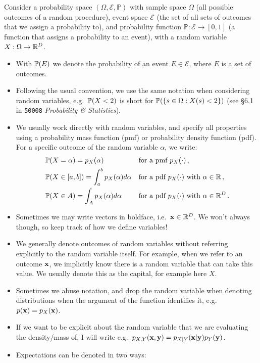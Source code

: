 \documentclass[a4paper]{article}
\theoremstyle{definition}
\newcommand{\courseprobstats}{\texttt{50008} \textit{Probability \& Statistics}}
\begin{document}
Consider a probability space $(\Omega, \mathcal E, \mathbb P)$ with sample space $\Omega$ (all possible outcomes of a random procedure), event space $\mathcal E$ (the set of all sets of outcomes that we assign a probability to), and probability function $\mathbb P : \mathcal E \to [0, 1]$ (a function that assigns a probability to an event), with a random variable $X: \Omega \to \mathbb{R}^D$.
\begin{itemize}
\item With $\prob{E}$ we denote the probability of an event $E \in \mathcal E$, where $E$ is a set of outcomes.
\item Following the usual convention, we use the same notation when considering random variables, e.g.~$\prob{X < 2}$ is short for $\prob{\{s \in \Omega : X(s) < 2\}}$ (see \S6.1 in \courseprobstats).
\item We usually work directly with random variables, and specify all properties using a probability mass function (pmf) or probability density function (pdf). For a specific outcome of the random variable $\alpha$, we write:
\begin{align}
    &\prob{X=\alpha} = p_X(\alpha) && \text{for a pmf } p_X(\cdot) \,, \\
    &\prob{X \in [a, b]} = \int_a^b p_X(\alpha) d\alpha && \text{for a pdf $p_X(\cdot)$ with $\alpha \in \Reals$} \,, \\
    &\prob{X \in A} = \int_A p_X(\alpha) d\alpha && \text{for a pdf $p_X(\cdot)$ with $\alpha \in \Reals^D$}
    \,.
\end{align}
\item Sometimes we may write vectors in boldface, i.e.~$\mathbf x \in \mathbb{R}^D$. We won't always though, so keep track of how we define variables!
\item We generally denote outcomes of random variables without referring explicitly to the random variable itself. For example, when we refer to an outcome $\mathbf{x}$, we implicitly know there is a random variable that can take this value. We usually denote this as the capital, for example here $X$.
\item Sometimes we abuse notation, and drop the random variable when denoting distributions when the argument of the function identifies it, e.g.~$p(\mathbf{x}) = p_X(\mathbf{x})$.
\item If we want to be explicit about the random variable that we are evaluating the density/mass of, I will write e.g.~$p_{X,Y}(\mathbf{x},\mathbf{y}) = p_{X|Y}(\mathbf{x}|\mathbf{y})p_Y(\mathbf{y})$.
\item Expectations can be denoted in two ways:

\end{itemize}
\end{document}
